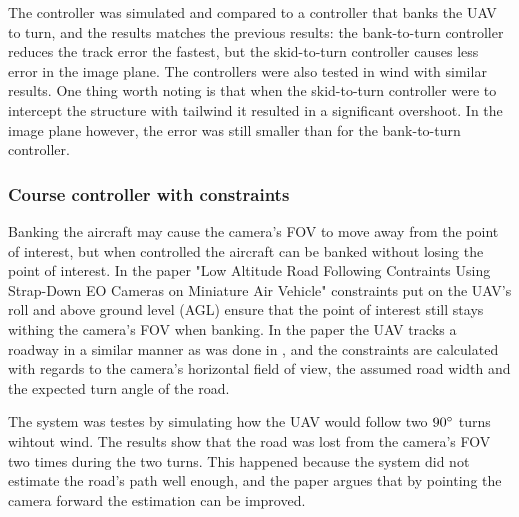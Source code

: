 The controller was simulated and compared to a controller that banks the UAV to turn, and the results matches the previous results: the bank-to-turn controller reduces the track error the fastest, but the skid-to-turn controller causes less error in the image plane. The controllers were also tested in wind with similar results. One thing worth noting is that when the skid-to-turn controller were to intercept the structure with tailwind it resulted in a significant overshoot. In the image plane however, the error was still smaller than for the bank-to-turn controller.


\subsubsection{Course controller with constraints}

Banking the aircraft may cause the camera's FOV to move away from the point of interest, but when controlled the aircraft can be banked without losing the point of interest. In the paper "Low Altitude Road Following Contraints Using Strap-Down EO Cameras on Miniature Air Vehicle" \cite{constraintsEGBERT} constraints put on the UAV's roll and above ground level (AGL) ensure that the point of interest still stays withing the camera's FOV when banking. In the paper the UAV tracks a roadway in a similar manner as was done in \cite{skidToTurnMills}, and the constraints are calculated with regards to the camera's horizontal field of view, the assumed road width and the expected turn angle of the road.


The system was testes by simulating how the UAV would follow two $90\degree$ turns wihtout wind. The results show that the road was lost from the camera's FOV two times during the two turns. This happened because the system did not estimate the road's path well enough, and the paper argues that by pointing the camera forward the estimation can be improved.